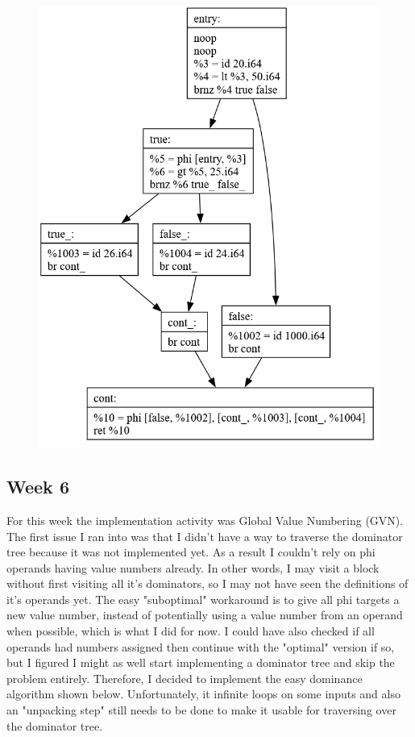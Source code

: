 \documentclass[11pt, a4paper, titlepage]{article}
\begin{document}
\begin{figure}[H]
  \centering
  \includegraphics[scale=0.4]{images/i16.png}
\end{figure}

\subsection{Week 6}

For this week the implementation activity was Global Value Numbering (GVN). The first issue I ran into was that I didn't have a way to traverse the dominator tree because it was not implemented yet. As a result I couldn't rely on phi operands having value numbers already. In other words, I may visit a block without first visiting all it's dominators, so I may not have seen the definitions of it's operands yet. The easy "suboptimal" workaround is to give all phi targets a new value number, instead of potentially using a value number from an operand when possible, which is what I did for now. I could have also checked if all operands had numbers assigned then continue with the "optimal" version if so, but I figured I might as well start implementing a dominator tree and skip the problem entirely. Therefore, I decided to implement the easy dominance algorithm shown below. Unfortunately, it infinite loops on some inputs and also an "unpacking step" still needs to be done to make it usable for traversing over the dominator tree.
\end{document}
